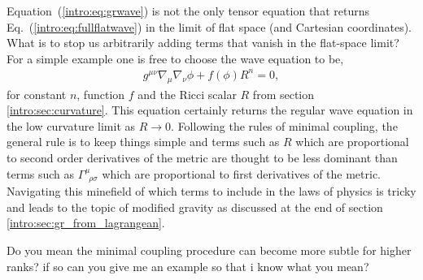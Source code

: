 Equation~(\ref{intro:eq:grwave}) is not the only tensor equation that returns Eq.~(\ref{intro:eq:fullflatwave}) in the limit of flat space (and Cartesian coordinates). What is to stop us arbitrarily adding terms that vanish in the flat-space limit? For a simple example one is free to choose the wave equation to be,
\begin{align}
g^{\mu\nu}\nabla_\mu\nabla_\nu \phi + f(\phi) R^n = 0, \label{intro:eq:modified_wave}
\end{align}
for constant $n$, function $f$ and the Ricci scalar $R$ from section \ref{intro:sec:curvature}. This equation certainly returns the regular wave equation in the low curvature limit as $R\rightarrow 0$. Following the rules of minimal coupling, the general rule is to keep things simple and terms such as $R$ which are proportional to second order derivatives of the metric are thought to be less dominant than terms such as $\Gamma^\mu_{\,\,\,\rho\sigma}$ which are proportional to first derivatives of the metric. Navigating this minefield of which terms to include in the laws of physics is tricky and leads to the topic of modified gravity as discussed at the end of section \ref{intro:sec:gr_from_lagrangean}.

\color{choral} Do you mean the minimal coupling procedure can become more subtle for higher ranks? if so can you give me an example so that i know what you mean?\color{black}







